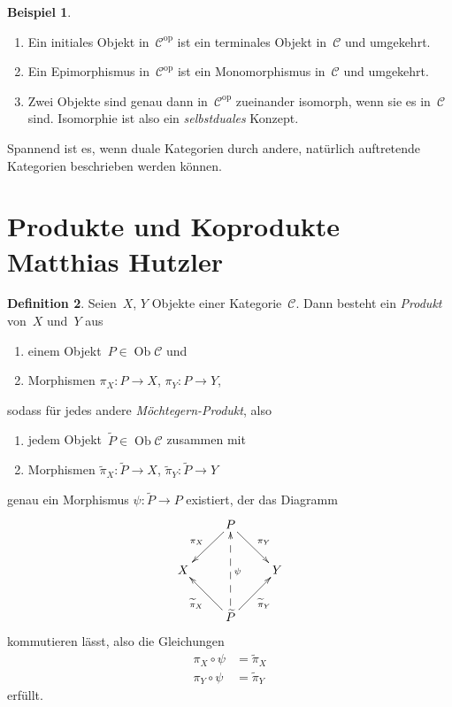 \documentclass[a4paper,ngerman]{scrartcl}
\theoremstyle{definition}
\newtheorem{defn}{Definition}[section]
\newtheorem{bsp}[defn]{Beispiel}
\theoremstyle{plain}
\theoremstyle{remark}
\newcommand{\C}{\mathcal{C}}
\DeclareMathOperator{\Ob}{Ob}
\newcommand{\op}{\mathrm{op}}
\begin{document}
\begin{bsp}\begin{enumerate}
\item Ein initiales Objekt in~$\C^\op$ ist ein terminales Objekt in~$\C$ und
umgekehrt.
\item Ein Epimorphismus in~$\C^\op$ ist ein Monomorphismus in~$\C$ und
umgekehrt.
\item Zwei Objekte sind genau dann in~$\C^\op$ zueinander isomorph, wenn sie es
in~$\C$ sind. Isomorphie ist also ein \emph{selbstduales} Konzept.
\end{enumerate}\end{bsp}

Spannend ist es, wenn duale Kategorien durch andere, natürlich
auftretende Kategorien beschrieben werden können.


\section[Produkte und Koprodukte]{Produkte und Koprodukte \hfill \small
Matthias Hutzler}

\begin{defn}Seien~$X$, $Y$ Objekte einer Kategorie~$\C$. Dann besteht ein
\emph{Produkt} von~$X$ und~$Y$ aus
\begin{enumerate}
\item einem Objekt~$P \in \Ob \C$ und
\item Morphismen $\pi_X : P \to X$, $\pi_Y : P \to Y$,
\end{enumerate}
sodass für jedes andere \emph{Möchtegern-Produkt}, also
\begin{enumerate}
\item jedem Objekt~$\widetilde P \in \Ob \C$ zusammen mit
\item Morphismen $\widetilde \pi_X : \widetilde P \to X$, $\widetilde\pi_Y :
\widetilde P \to Y$
\end{enumerate}
genau ein Morphismus $\psi : \widetilde P \to P$ existiert, der das Diagramm
\[ \xymatrix{
    & P \ar[ld]_{\pi_X} \ar[rd]^{\pi_Y} \\
  X & & Y \\
    & \widetilde P \ar[lu]^{\widetilde \pi_X} \ar@{-->}[uu]_\psi \ar[ru]_{\widetilde \pi_Y}
  } \]
kommutieren lässt, also die Gleichungen
\begin{align*}
  \pi_X \circ \psi &= \widetilde \pi_X \\
  \pi_Y \circ \psi &= \widetilde \pi_Y
\end{align*}
erfüllt.
\end{defn}
\end{document}
